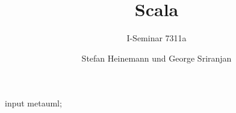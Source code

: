 \documentclass[oneside,DIV12,BCOR0.5cm,bibliography=totoc]{template}
\begin{document}
\begin{empfile}
\begin{empcmds}
input metauml;
\end{empcmds}


\title{Scala}
\subtitle{I-Seminar 7311a}

\author{Stefan Heinemann und George Sriranjan}

\maketitle



\tableofcontents











\end{empfile}
\end{document}
